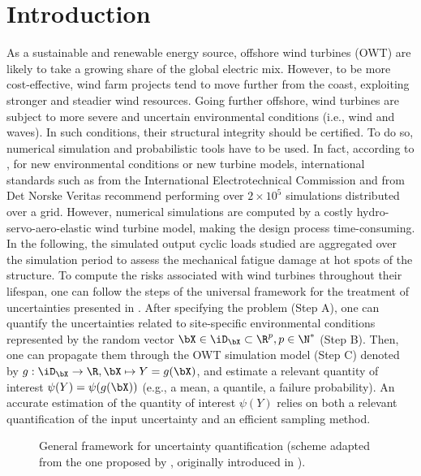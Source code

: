 \section{Introduction}
As a sustainable and renewable energy source, offshore wind turbines (OWT) are likely to take a growing share of the global electric mix. 
However, to be more cost-effective, wind farm projects tend to move further from the coast, exploiting stronger and steadier wind resources. 
Going further offshore, wind turbines are subject to more severe and uncertain environmental conditions (i.e., wind and waves). 
In such conditions, their structural integrity should be certified. 
To do so, numerical simulation and probabilistic tools have to be used. 
In fact, according to \cite{graf_2016}, for new environmental conditions or new turbine models, international standards such as \cite{iec_2019} from the International Electrotechnical Commission and \cite{dnv_loads_2016} from Det Norske Veritas recommend performing over $2 \times 10^5$ simulations distributed over a grid. 
However, numerical simulations are computed by a costly hydro-servo-aero-elastic wind turbine model, making the design process time-consuming. 
In the following, the simulated output cyclic loads studied are aggregated over the simulation period to assess the mechanical fatigue damage at hot spots of the structure. 
To compute the risks associated with wind turbines throughout their lifespan, one can follow the steps of the universal framework for the treatment of uncertainties \citep{rocquigny_2008} presented in . 
After specifying the problem (Step A), one can quantify the uncertainties related to site-specific environmental conditions represented by the random vector $\bX \in \iD_{\bX} \subset \R^p, p\in \N^{*}$ (Step B). 
Then, one can propagate them through the OWT simulation model (Step C) denoted by $g: \iD_{\bX}\rightarrow \R, \bX \mapsto Y = g(\bX)$, and estimate a relevant quantity of interest $\psi(Y) = \psi(g(\bX))$ (e.g., a mean, a quantile, a failure probability). 
An accurate estimation of the quantity of interest $\psi(Y)$ relies on both a relevant quantification of the input uncertainty and an efficient sampling method.

\begin{figure}[!h]
    \centering
    
    \caption{General framework for uncertainty quantification (scheme adapted from the one proposed by \cite{ajenjo_2023}, originally introduced in \cite{rocquigny_2008}).}
    \label{fig:UQ}
\end{figure}

